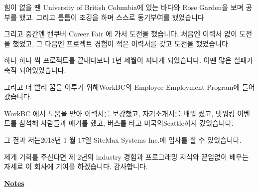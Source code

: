 \documentclass[12pt]{article}
\begin{document}
\bigskip

힘이 없을 땐 University of British Columbia에 있는 바다와 Rose Garden을 보며 공부를 했고. 그리고 틈틈이 조깅을 하며 스스로 동기부여를 했었습니다

\bigskip

그리고 중간엔 밴쿠버 Career Fair 에 가서 도전을 했습니다. 처음엔 이력서 없이 도전을 했었고, 그 다음엔 프로젝트 경험이 적은 이력서를 갖고 도전을 했었습니다.

\bigskip

하나 하나 씩 프로잭트를 끝내다보니 1년 세월이 지나게 되었습니다. 이땐 많은 실패가 축적 되어있었습니다.

\bigskip

그리고 더 빨리 꿈을 이루기 위해WorkBC의 Employee Employment Program에 들어갔습니다.

\bigskip

WorkBC 에서 도움을 받아 이력서를 보강했고, 자기소개서를 배워 썼고, 넷워킹 이벤트를 참석해 사람들과 얘기를 했고, 버스를 타고 미국의Seattle까지 갔었습니다.

\bigskip

그 결과 저는2018년 1 월 17일 SiteMax Systems Inc.에 입사를 할 수 있었습니다.

\bigskip

제게 기회를 주신다면 제 2년의 industry 경험과 프로그래밍 지식와 끝임없이 배우는 자세로 이 회사에 기여를 하겠습니다. 감사합니다.

\bigskip

\underline{\textbf{Notes}}
\end{document}

